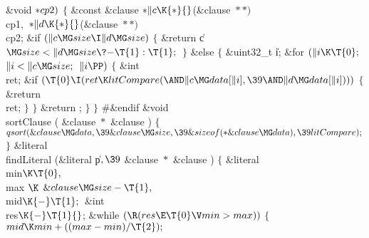 {{{{{\&{void} ${}{*}\\{cp2}){}$\1\1\2\2\6
${}\{{}$\1\6
\&{const} \&{clause} ${}{*}\|c\K{*}{}$(\&{clause} ${}{*}{*}){}$ \\{cp1}${},{}$
${}{*}\|d\K{*}{}$(\&{clause} ${}{*}{*}){}$ \\{cp2};\7
\&{if} ${}(\|c\MG\\{size}\I\|d\MG\\{size}){}$\5
${}\{{}$\1\6
\&{return} \|c${}\MG\\{size}<\|d\MG\\{size}\?{-}\T{1}:\T{1};{}$\6
\4${}\}{}$\2\6
\&{else}\5
${}\{{}$\1\6
\&{uint32\_t} \|i;\7
\&{for} ${}(\|i\K\T{0};{}$ ${}\|i<\|c\MG\\{size};{}$ ${}\|i\PP){}$\5
${}\{{}$\1\6
\&{int} \\{ret};\7
\&{if} ${}(\T{0}\I(\\{ret}\K\\{litCompare}({\AND}\|c\MG\\{data}[\|i],\39{\AND}%
\|d\MG\\{data}[\|i]))){}$\5
${}\{{}$\1\6
\&{return} \\{ret};\6
\4${}\}{}$\2\6
\4${}\}{}$\2\6
\&{return} ;\6
\4${}\}{}$\2\6
\4${}\}{}$\2\6
\8\#\&{endif}\6
\&{void}  \\{sortClause} ( \&{clause} ${}{*}{}$\1\1 \&{clause} ) \6
${}\{{}$\1\6
${}\\{qsort}(\&{clause}\MG\\{data},\39\&{clause}\MG\\{size},\39\&{sizeof}({*}%
\&{clause}\MG\\{data}),\39\\{litCompare});{}$\6
\4${}\}{}$\2\6
\&{literal}  \\{findLiteral} (\&{literal} \|p${},\39$ \&{clause} ${}{*}{}$\1\1 %
\&{clause} ) $\{$ \&{literal} \\{min}${}\K\T{0},{}$ \\{max} $\K$ $\&{clause}\MG%
\\{size}-\T{1},{}$ \\{mid}${}\K{-}\T{1};{}$\6
\&{int} \\{res}${}\K{-}\T{1}{}$;\7
\&{while} ${}(\R(\\{res}\E\T{0}\V\\{min}>\\{max})){}$\5
${}\{{}$\1\6
${}\\{mid}\K\\{min}+((\\{max}-\\{min})/\T{2});{}$\6
}}}}}
